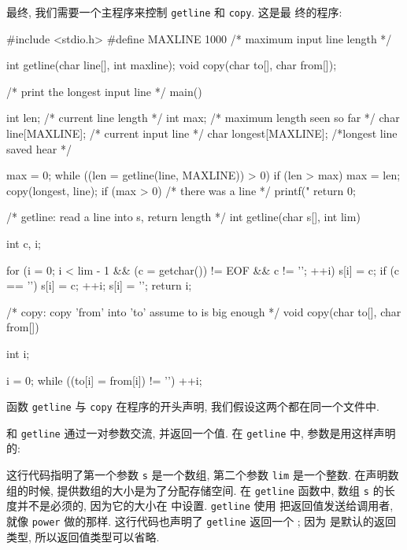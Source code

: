 最终, 我们需要一个主程序来控制 \texttt{getline} 和 \texttt{copy}. 这是最
终的程序:
\begin{myverbatim}
    #include <stdio.h>
    #define MAXLINE 1000    /* maximum input line length */

    int getline(char line[], int maxline);
    void copy(char to[], char from[]);

    /* print the longest input line */
    main()
    {
        int     len;                /* current line length */
        int     max;                /* maximum length seen so far */
        char    line[MAXLINE];      /* current input line */
        char    longest[MAXLINE];   /*longest line saved hear */

        max = 0;
        while ((len = getline(line, MAXLINE)) > 0)
            if (len > max) {
                max = len;
                copy(longest, line);
            }
        if (max > 0) /* there was a line */
            printf("%
        return 0;
    }

    /* getline: read a line into s, return length */
    int getline(char s[], int lim)
    {
        int c, i;

        for (i = 0; i < lim - 1 && (c = getchar()) != EOF && c != '\n'; ++i)
            s[i] = c;
        if (c == '\n') {
            s[i] = c;
            ++i;
        }
        s[i] = '\0';
        return i;
    }

    /* copy: copy 'from' into 'to' assume to is big enough */
    void copy(char to[], char from[])
    {
        int i;

        i = 0; 
        while ((to[i] = from[i]) != '\0')
            ++i;
    }
\end{myverbatim}
函数 \texttt{getline} 与 \texttt{copy} 在程序的开头声明,
我们假设这两个都在同一个文件中.

\cmain 和 \texttt{getline} 通过一对参数交流, 并返回一个值. 在
\texttt{getline} 中, 参数是用这样声明的:
\begin{myverbatim} int getline{char s[], int lim); \end{myverbatim}
这行代码指明了第一个参数 \texttt{s} 是一个数组, 第二个参数 \texttt{lim}
是一个整数. 在声明数组的时候, 提供数组的大小是为了分配存储空间. 在
\texttt{getline} 函数中, 数组 \texttt{s} 的长度并不是必须的, 因为它的大小在
\cmain 中设置. \texttt{getline} 使用 \creturn 把返回值发送给调用者, 就像
\texttt{power} 做的那样. 这行代码也声明了 \texttt{getline} 返回一个 \cint;
因为 \cint 是默认的返回类型, 所以返回值类型可以省略.

